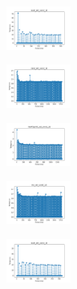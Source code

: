 \begin{figure}[H]
\begin{subfigure}
    \end{subfigure}
    \hfill
    \begin{subfigure}
        \centering
        \includegraphics[width=0.234\textwidth]{img/am10/ecoli_set_const_10_589741062_time.png}
    \end{subfigure}
    \hfill
    \begin{subfigure}
        \centering
        \includegraphics[width=0.234\textwidth]{img/am10/rand_set_const_10_589741062_time.png}
    \end{subfigure}
    \hfill
    \begin{subfigure}
        \centering
        \includegraphics[width=0.234\textwidth]{img/am10/newthyroid_set_const_10_589741062_time.png}
    \end{subfigure}
    \hfill
    \begin{subfigure}
        \centering
        \includegraphics[width=0.234\textwidth]{img/am10/iris_set_const_10_277451237_time.png}
    \end{subfigure}
    \hfill
    \begin{subfigure}
        \centering
        \includegraphics[width=0.234\textwidth]{img/am10/ecoli_set_const_10_277451237_time.png}
    \end{subfigure}
    \hfill
    \begin{subfigure}

\end{subfigure}
\end{figure}
